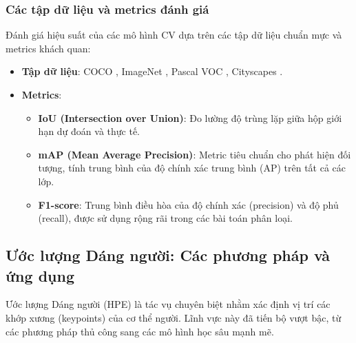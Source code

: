 \subsubsection{Các tập dữ liệu và metrics đánh giá}
Đánh giá hiệu suất của các mô hình CV dựa trên các tập dữ liệu chuẩn mực và metrics khách quan:
\begin{itemize}
    \item \textbf{Tập dữ liệu}: COCO \cite{lin2014microsoft}, ImageNet \cite{deng2009imagenet}, Pascal VOC \cite{everingham2015pascal}, Cityscapes \cite{cordts2016cityscapes}.
    \item \textbf{Metrics}:
    \begin{itemize}
        \item \textbf{IoU (Intersection over Union)}: Đo lường độ trùng lặp giữa hộp giới hạn dự đoán và thực tế.
        \item \textbf{mAP (Mean Average Precision)}: Metric tiêu chuẩn cho phát hiện đối tượng, tính trung bình của độ chính xác trung bình (AP) trên tất cả các lớp.
        \item \textbf{F1-score}: Trung bình điều hòa của độ chính xác (precision) và độ phủ (recall), được sử dụng rộng rãi trong các bài toán phân loại.
    \end{itemize}
\end{itemize}

\subsection{Ước lượng Dáng người: Các phương pháp và ứng dụng}
Ước lượng Dáng người (HPE) là tác vụ chuyên biệt nhằm xác định vị trí các khớp xương (keypoints) của cơ thể người. Lĩnh vực này đã tiến bộ vượt bậc, từ các phương pháp thủ công sang các mô hình học sâu mạnh mẽ.

